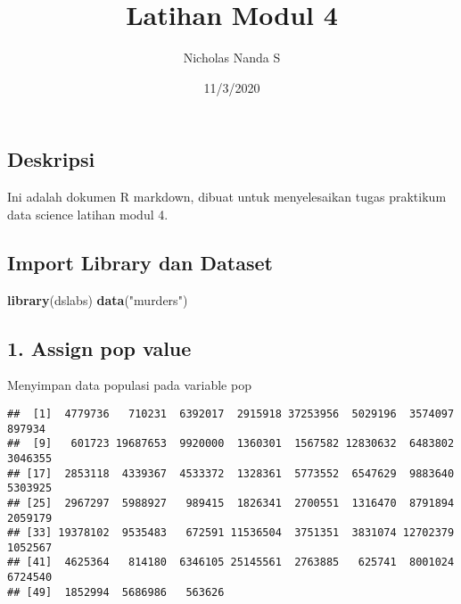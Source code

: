 \documentclass[
]{article}
\title{Latihan Modul 4}
\author{Nicholas Nanda S}
\date{11/3/2020}
\newenvironment{Shaded}{\begin{snugshade}}{\end{snugshade}}
\newcommand{\KeywordTok}[1]{\textcolor[rgb]{0.13,0.29,0.53}{\textbf{#1}}}
\newcommand{\NormalTok}[1]{#1}
\newcommand{\OperatorTok}[1]{\textcolor[rgb]{0.81,0.36,0.00}{\textbf{#1}}}
\newcommand{\StringTok}[1]{\textcolor[rgb]{0.31,0.60,0.02}{#1}}
\begin{document}
\maketitle

\hypertarget{deskripsi}{%
\subsection{Deskripsi}\label{deskripsi}}

Ini adalah dokumen R markdown, dibuat untuk menyelesaikan tugas
praktikum data science latihan modul 4.

\hypertarget{import-library-dan-dataset}{%
\subsection{Import Library dan
Dataset}\label{import-library-dan-dataset}}

\begin{Shaded}
\begin{Highlighting}[]
\KeywordTok{library}\NormalTok{(dslabs)}
\KeywordTok{data}\NormalTok{(}\StringTok{"murders"}\NormalTok{)}
\end{Highlighting}
\end{Shaded}

\hypertarget{assign-pop-value}{%
\subsection{1. Assign pop value}\label{assign-pop-value}}

Menyimpan data populasi pada variable pop

\begin{Shaded}
\end{Shaded}

\begin{verbatim}
##  [1]  4779736   710231  6392017  2915918 37253956  5029196  3574097   897934
##  [9]   601723 19687653  9920000  1360301  1567582 12830632  6483802  3046355
## [17]  2853118  4339367  4533372  1328361  5773552  6547629  9883640  5303925
## [25]  2967297  5988927   989415  1826341  2700551  1316470  8791894  2059179
## [33] 19378102  9535483   672591 11536504  3751351  3831074 12702379  1052567
## [41]  4625364   814180  6346105 25145561  2763885   625741  8001024  6724540
## [49]  1852994  5686986   563626
\end{verbatim}
\end{document}
